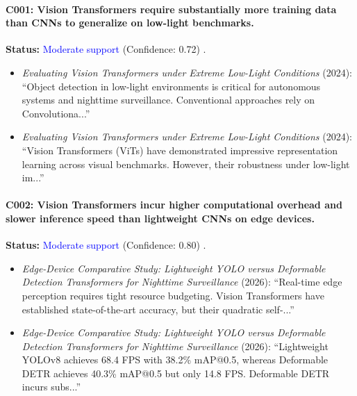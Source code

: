 \documentclass[11pt,a4paper]{article}
\begin{document}
\paragraph{C001: Vision Transformers require substantially more training data than CNNs to generalize on low-light benchmarks.}
\textbf{Status:} \textcolor{blue}{Moderate support} (Confidence: 0.72) \cite{paper_001}\cite{paper_001}\cite{paper_001}.
\begin{itemize}
    \item \textit{Evaluating Vision Transformers under Extreme Low-Light Conditions} (2024): ``Object detection in low-light environments is critical for autonomous systems and nighttime surveillance. Conventional approaches rely on Convolutiona...'' \cite{paper_001}
    \item \textit{Evaluating Vision Transformers under Extreme Low-Light Conditions} (2024): ``Vision Transformers (ViTs) have demonstrated impressive representation learning across visual benchmarks. However, their robustness under low-light im...'' \cite{paper_001}
\end{itemize}


\paragraph{C002: Vision Transformers incur higher computational overhead and slower inference speed than lightweight CNNs on edge devices.}
\textbf{Status:} \textcolor{blue}{Moderate support} (Confidence: 0.80) \cite{paper_004}\cite{paper_004}.
\begin{itemize}
    \item \textit{Edge-Device Comparative Study: Lightweight YOLO versus Deformable Detection Transformers for Nighttime Surveillance} (2026): ``Real-time edge perception requires tight resource budgeting. Vision Transformers have established state-of-the-art accuracy, but their quadratic self-...'' \cite{paper_004}
    \item \textit{Edge-Device Comparative Study: Lightweight YOLO versus Deformable Detection Transformers for Nighttime Surveillance} (2026): ``Lightweight YOLOv8 achieves 68.4 FPS with 38.2\% mAP@0.5, whereas Deformable DETR achieves 40.3\% mAP@0.5 but only 14.8 FPS. Deformable DETR incurs subs...'' \cite{paper_004}
\end{itemize}
\end{document}
